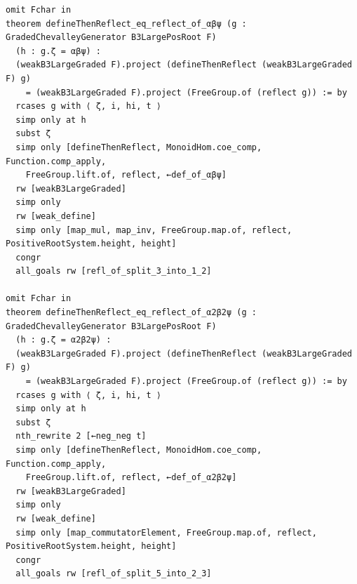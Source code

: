 \documentclass[10pt,a4paper]{article}
\begin{document}
\begin{Verbatim}
omit Fchar in
theorem defineThenReflect_eq_reflect_of_αβψ (g : GradedChevalleyGenerator B3LargePosRoot F)
  (h : g.ζ = αβψ) :
  (weakB3LargeGraded F).project (defineThenReflect (weakB3LargeGraded F) g)
    = (weakB3LargeGraded F).project (FreeGroup.of (reflect g)) := by
  rcases g with ⟨ ζ, i, hi, t ⟩
  simp only at h
  subst ζ
  simp only [defineThenReflect, MonoidHom.coe_comp, Function.comp_apply,
    FreeGroup.lift.of, reflect, ←def_of_αβψ]
  rw [weakB3LargeGraded]
  simp only
  rw [weak_define]
  simp only [map_mul, map_inv, FreeGroup.map.of, reflect, PositiveRootSystem.height, height]
  congr
  all_goals rw [refl_of_split_3_into_1_2]

omit Fchar in
theorem defineThenReflect_eq_reflect_of_α2β2ψ (g : GradedChevalleyGenerator B3LargePosRoot F)
  (h : g.ζ = α2β2ψ) :
  (weakB3LargeGraded F).project (defineThenReflect (weakB3LargeGraded F) g)
    = (weakB3LargeGraded F).project (FreeGroup.of (reflect g)) := by
  rcases g with ⟨ ζ, i, hi, t ⟩
  simp only at h
  subst ζ
  nth_rewrite 2 [←neg_neg t]
  simp only [defineThenReflect, MonoidHom.coe_comp, Function.comp_apply,
    FreeGroup.lift.of, reflect, ←def_of_α2β2ψ]
  rw [weakB3LargeGraded]
  simp only
  rw [weak_define]
  simp only [map_commutatorElement, FreeGroup.map.of, reflect, PositiveRootSystem.height, height]
  congr
  all_goals rw [refl_of_split_5_into_2_3]
\end{Verbatim}
\end{document}
